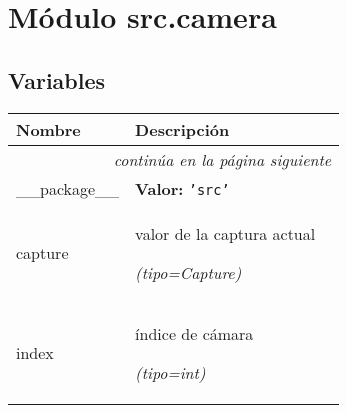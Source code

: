 %
%
%


\section{Módulo src.camera}

    \label{src:camera}


  \subsection{Variables}

    \vspace{-1cm}
\hspace{\varindent}\begin{longtable}{|p{\varnamewidth}|p{\vardescrwidth}|l}
\cline{1-2}
\cline{1-2} \centering \textbf{Nombre} & \centering \textbf{Descripción}& \\
\cline{1-2}
\endhead\cline{1-2}\multicolumn{3}{r}{\small\textit{continúa en la página siguiente}}\\\endfoot\cline{1-2}
\endlastfoot\raggedright \_\-\_\-p\-a\-c\-k\-a\-g\-e\-\_\-\_\- & \raggedright \textbf{Valor:} 
{\tt \texttt{'}\texttt{src}\texttt{'}}&\\
\cline{1-2}
\raggedright c\-a\-p\-t\-u\-r\-e\- & \raggedright valor de la captura actual

            {\it (tipo=Capture)}&\\
\cline{1-2}
\raggedright i\-n\-d\-e\-x\- & \raggedright índice de cámara

            {\it (tipo=int)}&\\
\cline{1-2}
\end{longtable}



